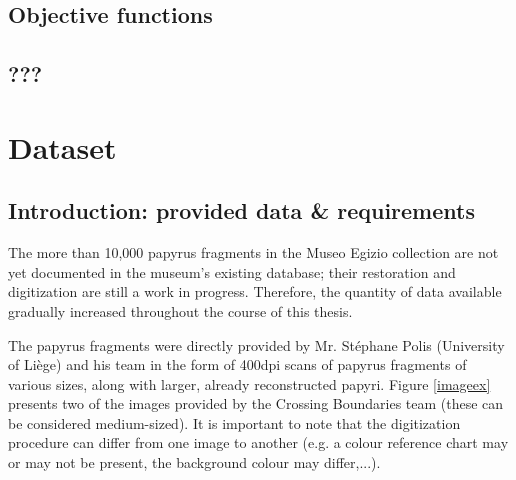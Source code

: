 \documentclass[11pt]{report}
\begin{document}
\section{Objective functions}



\section{???}



\chapter{Dataset}

\section{Introduction: provided data \& requirements}

The more than 10,000 papyrus fragments in the Museo Egizio collection are not yet documented in the museum's existing database; their restoration and digitization are still a work in progress. Therefore, the quantity of data available gradually increased throughout the course of this thesis.\newline

The papyrus fragments were directly provided by Mr. Stéphane Polis (University of Liège) and his team in the form of 400dpi scans of papyrus fragments of various sizes, along with larger, already reconstructed papyri. Figure \ref{imageex} presents two of the images provided by the Crossing Boundaries team (these can be considered medium-sized). It is important to note that the digitization procedure can differ from one image to another (e.g. a colour reference chart may or may not be present, the background colour may differ,...).
\end{document}
